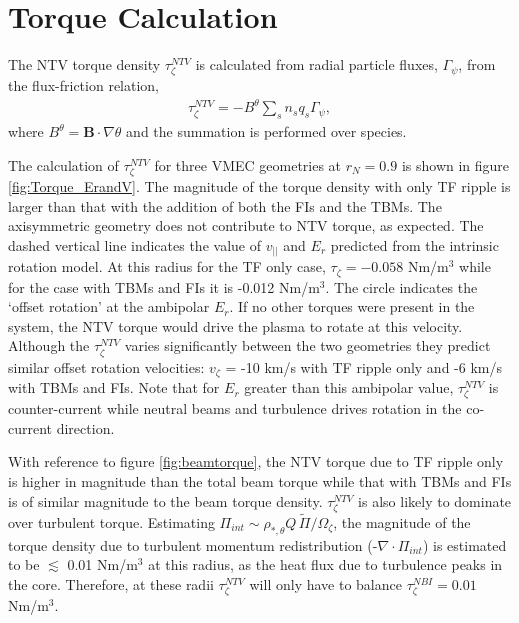 \documentclass{article}
\begin{document}
\FloatBarrier

\section{Torque Calculation}

The NTV torque density $\tau_{\zeta}^{NTV}$ is calculated from radial particle fluxes, $\Gamma_{\psi}$, from the flux-friction relation,
\begin{gather}
\tau_{\zeta}^{NTV} = - B^{\theta} \sum_s n_s q_s \Gamma_{\psi},
\end{gather}
where $B^{\theta} = \bm{B} \cdot \nabla \theta$ and the summation is performed over species. 

The calculation of $\tau_{\zeta}^{NTV}$ for three VMEC geometries at $r_N = 0.9$ is shown in figure \ref{fig:Torque_ErandV}. The magnitude of the torque density with only TF ripple is larger than that with the addition of both the FIs and the TBMs. The axisymmetric geometry does not contribute to NTV torque, as expected. The dashed vertical line indicates the value of $v_{||}$ and $E_r$ predicted from the intrinsic rotation model. At this radius for the TF only case, $\tau_{\zeta} = -0.058$ Nm/m$^3$ while for the case with TBMs and FIs it is -0.012 Nm/m$^3$. The circle indicates the `offset rotation' at the ambipolar $E_r$. If no other torques were present in the system, the NTV torque would drive the plasma to rotate at this velocity. Although the $\tau_{\zeta}^{NTV}$ varies significantly between the two geometries they predict similar offset rotation velocities: $v_{\zeta}$ = -10 km/s with TF ripple only and -6 km/s with TBMs and FIs. Note that for $E_r$ greater than this ambipolar value, $\tau_{\zeta}^{NTV}$ is counter-current while neutral beams and turbulence drives rotation in the co-current direction.

With reference to figure \ref{fig:beamtorque}, the NTV torque due to TF ripple only is higher in magnitude than the total beam torque while that with TBMs and FIs is of similar magnitude to the beam torque density. $\tau_{\zeta}^{NTV}$ is also likely to dominate over turbulent torque. Estimating $\Pi_{int} \sim \rho_{*, \theta} Q\, \widetilde{\Pi}/\Omega_{\zeta}$, the magnitude of the torque density due to turbulent momentum redistribution (-$\nabla \cdot \Pi_{int}$) is estimated to be $\lesssim $ 0.01 Nm/m$^3$ at this radius, as the heat flux due to turbulence peaks in the core. Therefore, at these radii $\tau_{\zeta}^{NTV}$ will only have to balance $\tau_{\zeta}^{NBI} = 0.01$ Nm/m$^3$. 
\end{document}
